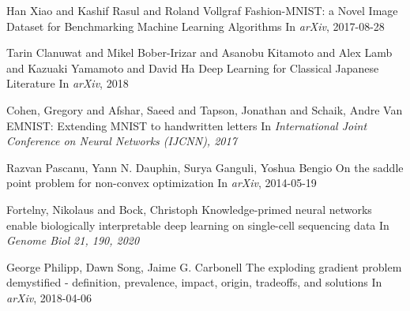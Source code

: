 \documentclass{article}
\begin{document}
\begin{thebibliography}{1}
Han Xiao and Kashif Rasul and Roland Vollgraf
\newblock Fashion-MNIST: a Novel Image Dataset for Benchmarking Machine Learning Algorithms
\newblock In {\em arXiv}, 2017-08-28

Tarin Clanuwat and Mikel Bober-Irizar and Asanobu Kitamoto and Alex Lamb and Kazuaki Yamamoto and David Ha
\newblock Deep Learning for Classical Japanese Literature
\newblock In {\em arXiv}, 2018

Cohen, Gregory and Afshar, Saeed and Tapson, Jonathan and Schaik, Andre Van
\newblock EMNIST: Extending MNIST to handwritten letters
\newblock In {\em International Joint Conference on Neural Networks (IJCNN), 2017}


Razvan Pascanu, Yann N. Dauphin, Surya Ganguli, Yoshua Bengio
\newblock On the saddle point problem for non-convex optimization
\newblock In {\em arXiv}, 2014-05-19

Fortelny, Nikolaus and Bock, Christoph
\newblock Knowledge-primed neural networks enable biologically interpretable deep learning on single-cell sequencing data
\newblock In {\em Genome Biol 21, 190, 2020}

George Philipp, Dawn Song, Jaime G. Carbonell
\newblock The exploding gradient problem demystified - definition, prevalence, impact, origin, tradeoffs, and solutions
\newblock In {\em arXiv}, 2018-04-06

\end{thebibliography}
\end{document}
